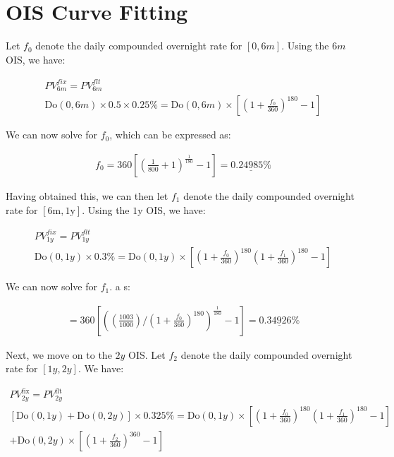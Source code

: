 \documentclass[12pt]{article}
\begin{document}
\section*{OIS Curve Fitting}

Let $f_0$ denote the daily compounded overnight rate for $[0, 6m]$. Using the $6m$ OIS, we have:

\begin{gather*}
PV_{6m}^{fix} = PV_{6m}^{flt} \\
\text{Do}(0, 6m) \times 0.5 \times 0.25\% = \text{Do}(0, 6m) \times \left[\left(1 + \frac{f_0}{360}\right)^{180} - 1\right]
\end{gather*}

\noindent We can now solve for $f_0$, which can be expressed as:

\begin{gather*}
f_0 = 360 \left[\left(\frac{1}{800} +1\right)^\frac{1}{180}
-1\right]
= \underline{0.24985\%}
\end{gather*}

\noindent Having obtained this, we can then let $f_1$ denote the daily compounded overnight rate for $[6\text{m}, 1\text{y}]$. Using the $1\text{y}$ OIS, we have:

\begin{gather*}
PV_{1y}^{fix} = PV_{1y}^{flt} \\
\text{Do}(0, 1y) \times 0.3\% = \text{Do}(0, 1y) \times\left[
\left(1 + \frac{f_0}{360}\right)^{180} \left(1 + \frac{f_1}{360}\right)^{180} - 1\right]
\end{gather*}

\noindent We can now solve for $f_1$. a s:

\begin{gather*}
 = 360 \left[\left(\left(\frac{1003}{1000}\right) /\left( 1+\frac{f_0}{360}
\right)^{180}\right)^{\frac{1}{180}} -1\right]
= \underline{0.34926\%}
\end{gather*}


\noindent Next, we move on to the $2y$ OIS. Let $f_2$ denote the daily compounded overnight rate for $[1y, 2y]$. We have:

\begin{gather*}
PV_{2y}^{\text{fix}} = PV_{2y}^{\text{flt}} \\
\left[\text{Do}(0, 1y) + \text{Do}(0, 2y)\right] \times 0.325\% = 
\text{Do}(0, 1y) \times \left[\left(1 + \frac{f_0}{360}\right)^{180} \left(1 + \frac{f_1}{360}\right)^{180} - 1\right]\\
+ \text{Do}(0, 2y) \times \left[\left(1 + \frac{f_2}{360}\right)^{360} - 1\right]\\
\end{gather*}
\end{document}

